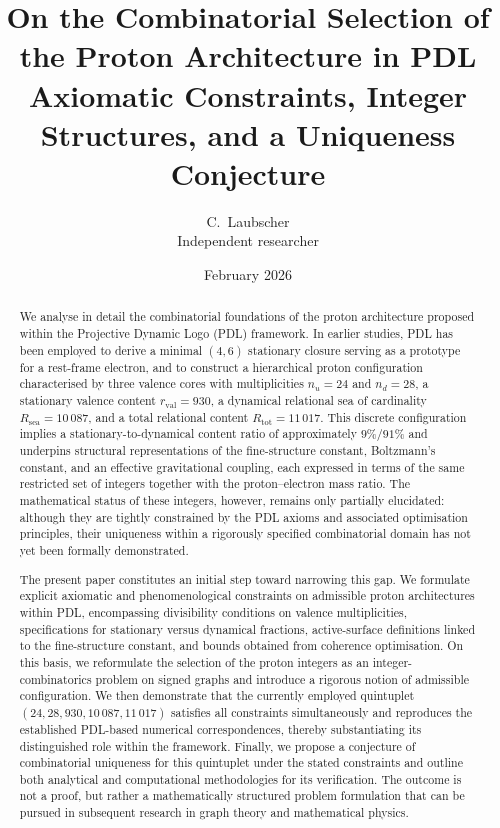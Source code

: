\documentclass[11pt,a4paper]{article}
\title{On the Combinatorial Selection of the Proton Architecture in PDL\\
Axiomatic Constraints, Integer Structures, and a Uniqueness Conjecture}
\author{C.\ Laubscher\\
{\small Independent researcher}}
\date{February 2026}
\begin{document}
\maketitle

\begin{abstract}
We analyse in detail the combinatorial foundations of the proton architecture proposed within the Projective Dynamic Logo (PDL) framework. In earlier studies, PDL has been employed to derive a minimal $(4,6)$ stationary closure serving as a prototype for a rest-frame electron, and to construct a hierarchical proton configuration characterised by three valence cores with multiplicities $n_u=24$ and $n_d=28$, a stationary valence content $r_{\mathrm{val}}=930$, a dynamical relational sea of cardinality $R_{\mathrm{sea}}=10\,087$, and a total relational content $R_{\mathrm{tot}}=11\,017$.\cite{LaubscherIntroPDL2026,LaubscherPDLFull2026,LaubscherLDP2026,LaubscherIMRadPDL2026} This discrete configuration implies a stationary-to-dynamical content ratio of approximately $9\%/91\%$ and underpins structural representations of the fine-structure constant, Boltzmann’s constant, and an effective gravitational coupling, each expressed in terms of the same restricted set of integers together with the proton–electron mass ratio.\cite{LaubscherIntroPDL2026,LaubscherPDLFull2026,LaubscherLDP2026} The mathematical status of these integers, however, remains only partially elucidated: although they are tightly constrained by the PDL axioms and associated optimisation principles, their uniqueness within a rigorously specified combinatorial domain has not yet been formally demonstrated.\cite{LaubscherPDLFull2026,LaubscherIMRadPDL2026}

The present paper constitutes an initial step toward narrowing this gap. We formulate explicit axiomatic and phenomenological constraints on admissible proton architectures within PDL, encompassing divisibility conditions on valence multiplicities, specifications for stationary versus dynamical fractions, active-surface definitions linked to the fine-structure constant, and bounds obtained from coherence optimisation.\cite{LaubscherIntroPDL2026,LaubscherPDLFull2026,LaubscherLDP2026,LaubscherIMRadPDL2026} On this basis, we reformulate the selection of the proton integers as an integer-combinatorics problem on signed graphs and introduce a rigorous notion of admissible configuration. We then demonstrate that the currently employed quintuplet $(24,28,930,10\,087,11\,017)$ satisfies all constraints simultaneously and reproduces the established PDL-based numerical correspondences, thereby substantiating its distinguished role within the framework.\cite{LaubscherPDLFull2026,LaubscherLDP2026,LaubscherDerivationAlpha2026} Finally, we propose a conjecture of combinatorial uniqueness for this quintuplet under the stated constraints and outline both analytical and computational methodologies for its verification. The outcome is not a proof, but rather a mathematically structured problem formulation that can be pursued in subsequent research in graph theory and mathematical physics.
\end{abstract}
\end{document}
